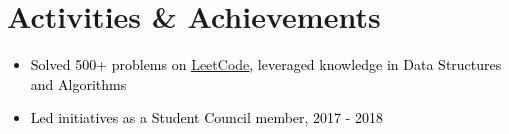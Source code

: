\documentclass[a4paper,20pt]{article}
\begin{document}

\section{Activities \& Achievements}
\vspace{5pt}
\begin{itemize}[label=\textbullet, labelsep=0.5em, left=0.5em, itemsep=-0.2em]
  \item \textcolor{black}{Solved 500+ problems on {\href{https://www.leetcode.com/evasabeeh/} {\underline{LeetCode}}}, leveraged knowledge in Data Structures and Algorithms}
  \item \textcolor{black}{Led initiatives as a Student Council member, 2017 - 2018}
\end{itemize}
\end{document}
